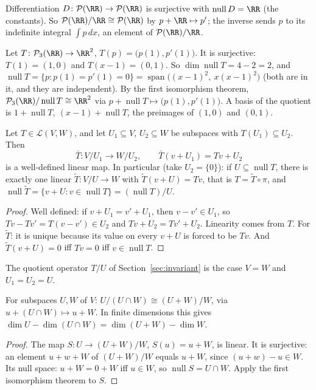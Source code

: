 \documentclass[10pt]{scrartcl}
\DeclareMathOperator{\nul}{null}
\DeclareMathOperator{\spn}{span}
\newcommand{\LL}{\mathcal L}
\newcommand{\PP}{\mathcal P}
\begin{document}
\begin{example*}[Ex.~43]
  Differentiation $D\colon\PP(\RR)\to\PP(\RR)$ is surjective with $\nul D=\RR$ (the constants). So $\PP(\RR)/\RR\cong\PP(\RR)$ by $p+\RR\mapsto p'$; the inverse sends $p$ to its indefinite integral $\int p\,dx$, an element of $\PP(\RR)/\RR$.
\end{example*}

\begin{example*}[A quotient of $\PP_3(\RR)$]
  Let $T\colon\PP_3(\RR)\to\RR^2$, $T(p)=\big(p(1),p'(1)\big)$. It is surjective: $T(1)=(1,0)$ and $T(x-1)=(0,1)$. So $\dim\nul T=4-2=2$, and $\nul T=\{p:p(1)=p'(1)=0\}=\spn\big((x-1)^2,\ x(x-1)^2\big)$ (both are in it, and they are independent). By the first isomorphism theorem, $\PP_3(\RR)/\nul T\cong\RR^2$ via $p+\nul T\mapsto\big(p(1),p'(1)\big)$. A basis of the quotient is $1+\nul T,\ (x-1)+\nul T$, the preimages of $(1,0)$ and $(0,1)$.
\end{example*}

\begin{proposition*}
  Let $T\in\LL(V,W)$, and let $U_1\subseteq V$, $U_2\subseteq W$ be subspaces with $T(U_1)\subseteq U_2$. Then
  \[ \bar T\colon V/U_1\to W/U_2,\qquad\bar T(v+U_1)=Tv+U_2 \]
  is a well-defined linear map. In particular (take $U_2=\{0\}$): if $U\subseteq\nul T$, there is exactly one linear $\tilde T\colon V/U\to W$ with $\tilde T(v+U)=Tv$, that is $T=\tilde T\circ\pi$, and $\nul\tilde T=\{v+U:v\in\nul T\}=(\nul T)/U$.
\end{proposition*}
\begin{proof}
  Well defined: if $v+U_1=v'+U_1$, then $v-v'\in U_1$, so $Tv-Tv'=T(v-v')\in U_2$ and $Tv+U_2=Tv'+U_2$. Linearity comes from $T$. For $\tilde T$: it is unique because its value on every $v+U$ is forced to be $Tv$. And $\tilde T(v+U)=0$ iff $Tv=0$ iff $v\in\nul T$.
\end{proof}
The quotient operator $T/U$ of Section~\ref{sec:invariant} is the case $V=W$ and $U_1=U_2=U$.

\begin{theorem*}
  For subspaces $U,W$ of $V$: $U/(U\cap W)\cong(U+W)/W$, via $u+(U\cap W)\mapsto u+W$. In finite dimensions this gives $\dim U-\dim(U\cap W)=\dim(U+W)-\dim W$.
\end{theorem*}
\begin{proof}
  The map $S\colon U\to(U+W)/W$, $S(u)=u+W$, is linear. It is surjective: an element $u+w+W$ of $(U+W)/W$ equals $u+W$, since $(u+w)-u\in W$. Its null space: $u+W=0+W$ iff $u\in W$, so $\nul S=U\cap W$. Apply the first isomorphism theorem to $S$.
\end{proof}
\end{document}

